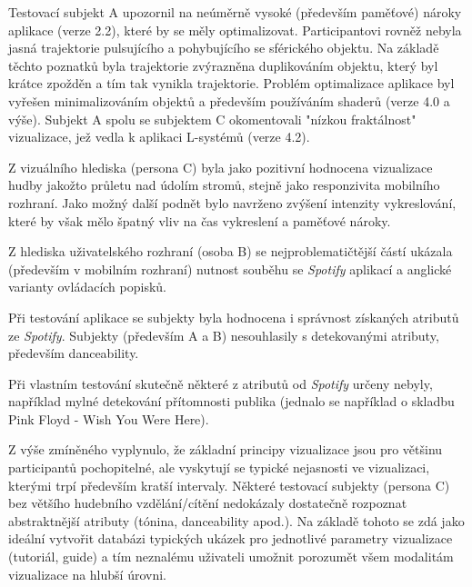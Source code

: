 \documentclass[thesis=B, czech]{FITthesis}[2019/03/06]
\begin{document}
Testovací subjekt A upozornil na neúměrně vysoké (především paměťové) nároky aplikace (verze 2.2), které by se měly optimalizovat. Participantovi rovněž nebyla jasná trajektorie pulsujícího a pohybujícího se sférického objektu. Na základě těchto poznatků byla trajektorie zvýrazněna duplikováním objektu, který byl krátce zpožděn a tím tak vynikla trajektorie. Problém optimalizace aplikace byl vyřešen minimalizováním objektů a především používáním shaderů (verze 4.0 a výše). Subjekt A spolu se subjektem C okomentovali "nízkou fraktálnost" vizualizace, jež vedla k aplikaci L-systémů (verze 4.2).

Z vizuálního hlediska (persona C) byla jako pozitivní hodnocena vizualizace hudby jakožto průletu nad údolím stromů, stejně jako responzivita mobilního rozhraní. Jako možný další podnět bylo navrženo zvýšení intenzity vykreslování, které by však mělo špatný vliv na čas vykreslení a paměťové nároky. 

Z hlediska uživatelského rozhraní (osoba B) se nejproblematičtější částí ukázala (především v mobilním rozhraní) nutnost souběhu se \textit{Spotify} aplikací a anglické varianty ovládacích popisků.  


Při testování aplikace se subjekty byla hodnocena i správnost získaných atributů ze \textit{Spotify}. Subjekty (především A a B) nesouhlasily s detekovanými atributy, především danceability. 

Při vlastním testování skutečně některé z atributů od \textit{Spotify} určeny nebyly, například mylné detekování přítomnosti publika (jednalo se například o skladbu Pink Floyd - Wish You Were Here).


Z výše zmíněného vyplynulo, že základní principy vizualizace jsou pro většinu participantů pochopitelné, ale vyskytují se typické nejasnosti ve vizualizaci, kterými trpí především kratší intervaly. Některé testovací subjekty (persona C) bez většího hudebního vzdělání/cítění nedokázaly dostatečně rozpoznat abstraktnější atributy (tónina, danceability apod.). Na základě tohoto se zdá jako ideální vytvořit databázi typických ukázek pro jednotlivé parametry vizualizace (tutoriál, guide) a tím neznalému uživateli umožnit porozumět všem modalitám vizualizace na hlubší úrovni. 







\end{document}
